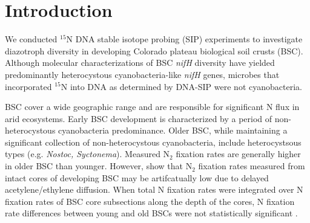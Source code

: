 \section{Introduction}

We conducted $^{15}$N DNA stable isotope probing (SIP) experiments to investigate diazotroph diversity in developing Colorado plateau biological soil crusts (BSC). Although molecular characterizations of BSC \textit{nifH} diversity have yielded predominantly heterocystous cyanobacteria-like \textit{nifH} genes, microbes that incorporated $^{15}$N into DNA as determined by DNA-SIP were not cyanobacteria.

BSC cover a wide geographic range and are responsible for significant N flux in arid ecosystems. Early BSC development is characterized by a period of non-heterocystous cyanobacteria predominance. Older BSC, while maintaining a significant collection of non-heterocystous cyanobacteria, include heterocystsous types (e.g. \textit{Nostoc, Syctonema}). Measured N$_{2}$ fixation rates are generally higher in older BSC than younger. However, \citet{15643930} show that N$_{2}$ fixation rates measured from intact cores of developing BSC may be artifcatually low due to delayed acetylene/ethylene diffusion. When total N fixation rates were integrated over N fixation rates of BSC core subsections along the depth of the cores, N fixation rate differences between young and old BSCs were not statistically significant \cite{15643930}.

